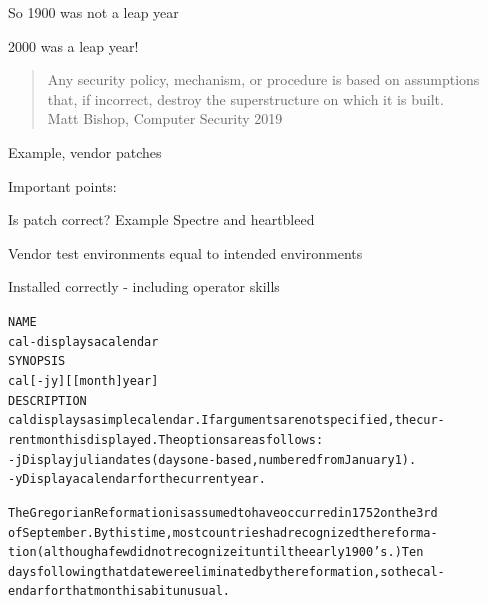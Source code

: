 \documentclass[Screen16to9,17pt]{foils}
\begin{document}
\begin{list2}
\item So 1900 was not a leap year
\item 2000 was a leap year!
\end{list2}



\begin{quote}
Any security policy, mechanism, or procedure is based on assumptions that, if incorrect, destroy the superstructure on which it is built.\\
Matt Bishop, Computer Security 2019
\end{quote}

\begin{list1}
\item Example, vendor patches
\item Important points:
\begin{list2}
\item Is patch correct? Example Spectre and heartbleed
\item Vendor test environments equal to intended environments
\item Installed correctly - including operator skills
\end{list2}
\end{list1}




\begin{alltt}\footnotesize
\small
NAME
     cal - displays a calendar
SYNOPSIS
     cal [-jy] [[month]  year]
DESCRIPTION
   cal displays a simple calendar.  If arguments are not specified, the cur-
   rent month is displayed.  The options are as follows:
   -j      Display julian dates (days one-based, numbered from January 1).
   -y      Display a calendar for the current year.

The Gregorian Reformation is assumed to have occurred in 1752 on the 3rd
of September.  By this time, most countries had recognized the reforma-
tion (although a few did not recognize it until the early 1900's.)  Ten
days following that date were eliminated by the reformation, so the cal-
endar for that month is a bit unusual.
\end{alltt}

\end{document}
